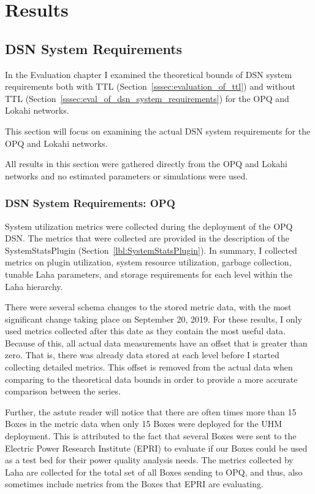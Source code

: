 \chapter{Results}\label{ch:results}

\section{DSN System Requirements}\label{sec:dsn-system-requirements}

In the Evaluation chapter I examined the theoretical bounds of DSN system requirements both with TTL (Section~\ref{sssec:evaluation_of_ttl}) and without TTL (Section~\ref{sssec:eval_of_dsn_system_requirements}) for the OPQ and Lokahi networks.

This section will focus on examining the actual DSN system requirements for the OPQ and Lokahi networks.

All results in this section were gathered directly from the OPQ and Lokahi networks and no estimated parameters or simulations were used.

\subsection{DSN System Requirements: OPQ}\label{subsec:dsn-system-requirements:-opq}

System utilization metrics were collected during the deployment of the OPQ DSN. The metrics that were collected are provided in the description of the SystemStatsPlugin (Section~\ref{lbl:SystemStatsPlugin}). In summary, I collected metrics on plugin utilization, system resource utilization, garbage collection, tunable Laha parameters, and storage requirements for each level within the Laha hierarchy.

There were several schema changes to the stored metric data, with the most significant change taking place on September 20, 2019. For these results, I only used metrics collected after this date as they contain the most useful data. Because of this, all actual data measurements have an offset that is greater than zero. That is, there was already data stored at each level before I started collecting detailed metrics. This offset is removed from the actual data when comparing to the theoretical data bounds in order to provide a more accurate comparison between the series.

Further, the astute reader will notice that there are often times more than 15 Boxes in the metric data when only 15 Boxes were deployed for the UHM deployment. This is attributed to the fact that several Boxes were sent to the Electric Power Research Institute (EPRI) to evaluate if our Boxes could be used as a test bed for their power quality analysis needs. The metrics collected by Laha are collected for the total set of all Boxes sending to OPQ, and thus, also sometimes include metrics from the Boxes that EPRI are evaluating.

